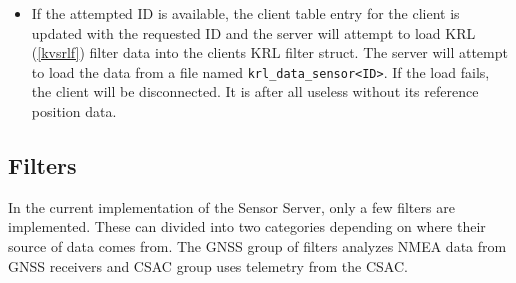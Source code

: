 \documentclass[12pt,english,a4paper]{report}
\begin{document}
\begin{itemize}
  \item If the attempted ID is available, the client table entry for the client is updated with the requested ID and the server will attempt to load KRL (\ref{kvsrlf}) filter data into the clients KRL filter struct. The server will attempt to load the data from a file named \texttt{krl\_data\_sensor<ID>}. If the load fails, the client will be disconnected. It is after all useless without its reference position data.
\end{itemize}

\subsection{Filters}\label{filters}
In the current implementation of the Sensor Server, only a few filters are implemented. These can divided into two categories depending on where their source of data comes from. The GNSS group of filters analyzes NMEA data from GNSS receivers and CSAC group uses telemetry from the CSAC.
\end{document}
